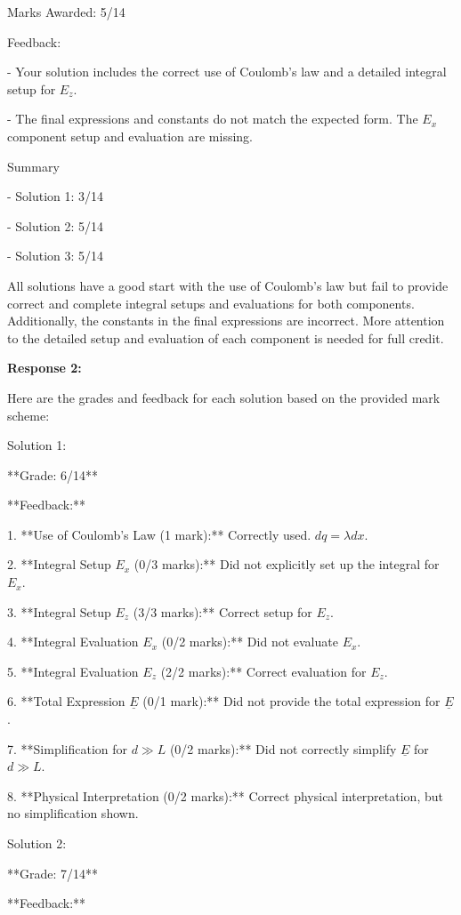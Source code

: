 \documentclass[a4paper,11pt]{article}
\begin{document}
Marks Awarded: 5/14

Feedback:

- Your solution includes the correct use of Coulomb's law and a detailed integral setup for \(E_z\). 

- The final expressions and constants do not match the expected form. The \(E_x\) component setup and evaluation are missing.

Summary

- Solution 1: 3/14

- Solution 2: 5/14

- Solution 3: 5/14

All solutions have a good start with the use of Coulomb's law but fail to provide correct and complete integral setups and evaluations for both components. Additionally, the constants in the final expressions are incorrect. More attention to the detailed setup and evaluation of each component is needed for full credit.

\bigskip
\textbf{Response 2:}

Here are the grades and feedback for each solution based on the provided mark scheme:

Solution 1:

**Grade: 6/14**

**Feedback:**

1. **Use of Coulomb's Law (1 mark):** Correctly used. \( dq = \lambda dx \).

2. **Integral Setup \( E_x \) (0/3 marks):** Did not explicitly set up the integral for \( E_x \).

3. **Integral Setup \( E_z \) (3/3 marks):** Correct setup for \( E_z \).

4. **Integral Evaluation \( E_x \) (0/2 marks):** Did not evaluate \( E_x \).

5. **Integral Evaluation \( E_z \) (2/2 marks):** Correct evaluation for \( E_z \).

6. **Total Expression \( \underline{E} \) (0/1 mark):** Did not provide the total expression for \( \underline{E} \).

7. **Simplification for \( d \gg L \) (0/2 marks):** Did not correctly simplify \( \underline{E} \) for \( d \gg L \).

8. **Physical Interpretation (0/2 marks):** Correct physical interpretation, but no simplification shown.

Solution 2:

**Grade: 7/14**

**Feedback:**
\end{document}
